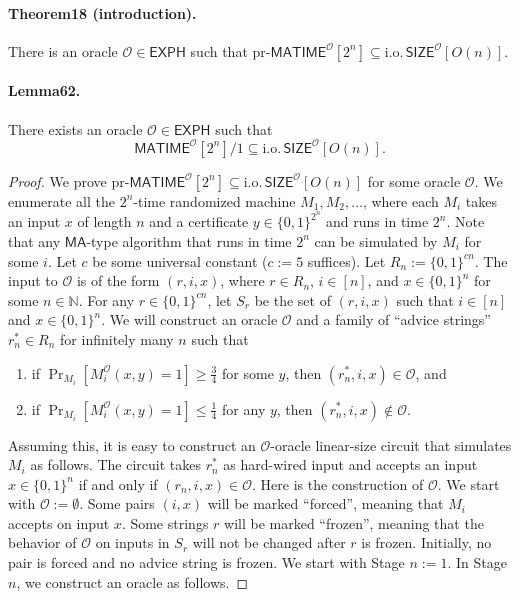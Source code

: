 \documentclass[10pt,a4paper]{article}
\begin{document}
\paragraph{Theorem18 (introduction).} There is an oracle $\mathcal O\in\mathsf{EXPH}$ such that $\mathrm{pr}\text{-}\mathsf{MATIME}^{\mathcal O}[2^n]\subseteq\mathrm{i.o.}\,\mathsf{SIZE}^{\mathcal O}[O(n)]$.
\paragraph{Lemma62.} There exists an oracle $\mathcal O\in\mathsf{EXPH}$ such that
\[\mathsf{MATIME}^{\mathcal O}[2^n]/1\subseteq\mathrm{i.o.}\,\mathsf{SIZE}^{\mathcal O}[O(n)].\]

\begin{proof}
We prove $\mathrm{pr}\text{-}\mathsf{MATIME}^{\mathcal O}[2^n]\subseteq\mathrm{i.o.}\,\mathsf{SIZE}^{\mathcal O}[O(n)]$ for some oracle $\mathcal O$. We enumerate all the $2^n$-time randomized machine $M_1,M_2,\ldots$, where each $M_i$ takes an input $x$ of length $n$ and a certificate $y\in\{0,1\}^{2^n}$ and runs in time $2^n$. Note that any $\mathsf{MA}$-type algorithm that runs in time $2^n$ can be simulated by $M_i$ for some $i$.
Let $c$ be some universal constant ($c:=5$ suffices). Let $R_n:=\{0,1\}^{cn}$. The input to $\mathcal O$ is of the form $(r,i,x)$, where $r\in R_n$, $i\in[n]$, and $x\in\{0,1\}^n$ for some $n\in\mathbb N$. For any $r\in\{0,1\}^{cn}$, let $S_r$ be the set of $(r,i,x)$ such that $i\in[n]$ and $x\in\{0,1\}^n$.
We will construct an oracle $\mathcal O$ and a family of ``advice strings'' $r_n^*\in R_n$ for infinitely many $n$ such that
\begin{enumerate}
\item if $\Pr_{M_i}[M_i^{\mathcal O}(x,y)=1]\geq\frac34$ for some $y$, then $(r_n^*,i,x)\in\mathcal O$, and
\item if $\Pr_{M_i}[M_i^{\mathcal O}(x,y)=1]\leq\frac14$ for any $y$, then $(r_n^*,i,x)\notin\mathcal O$.
\end{enumerate}
Assuming this, it is easy to construct an $\mathcal O$-oracle linear-size circuit that simulates $M_i$ as follows. The circuit takes $r_n^*$ as hard-wired input and accepts an input $x\in\{0,1\}^n$ if and only if $(r_n,i,x)\in\mathcal O$.
Here is the construction of $\mathcal O$. We start with $\mathcal O:=\emptyset$. Some pairs $(i,x)$ will be marked ``forced'', meaning that $M_i$ accepts on input $x$. Some strings $r$ will be marked ``frozen'', meaning that the behavior of $\mathcal O$ on inputs in $S_r$ will not be changed after $r$ is frozen. Initially, no pair is forced and no advice string is frozen. We start with Stage $n:=1$. In Stage $n$, we construct an oracle as follows.

\end{proof}
\end{document}
